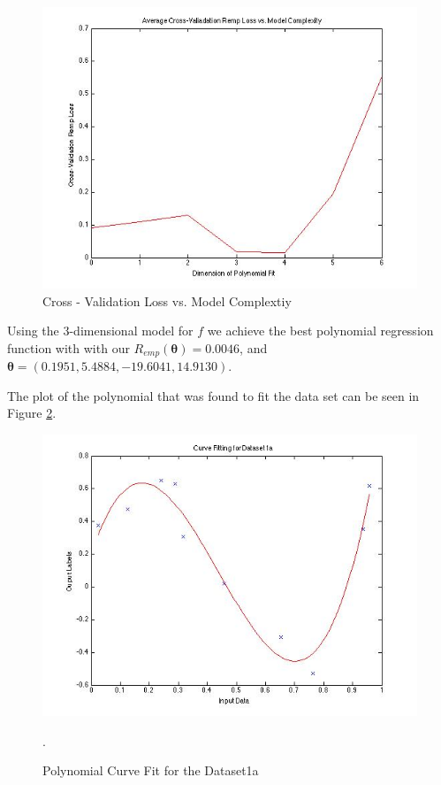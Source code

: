 \documentclass[paper=a4, fontsize=11pt]{scrartcl} %
\begin{document}
\begin{figure}
\centering
\includegraphics[scale=0.4]{Prob1_CrossValError.jpg}
\caption{Cross - Validation Loss vs. Model Complextiy}
\label{fig:Prob1_cross_val}
\end{figure}

Using the 3-dimensional model for $f$ we achieve the best polynomial regression function with  with our $R_{emp}(\bm{\theta}) = 0.0046$, and $\bm{\theta} = (0.1951, 5.4884, -19.6041, 14.9130)$.

The plot of the polynomial that was found to fit the data set can be seen in Figure \ref{fig:prob1_curve1}.

\begin{figure}
\centering
\includegraphics[scale=0.4]{Curve.jpg}
\caption{Polynomial Curve Fit for the Dataset1a}
\label{fig:prob1_curve1}.
\end{figure}
\end{document}
